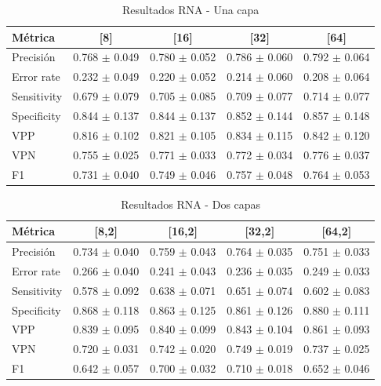 \documentclass[a4paper,10pt]{article}
\begin{document}
    \begin{table}[h!]
    \centering
    \caption{Resultados RNA - Una capa}
    \begin{tabular}{lcccc}
    \toprule
    Métrica & [8] & [16] & [32] & [64] \\
    \midrule
    Precisión & 0.768 $\pm$ 0.049 & 0.780 $\pm$ 0.052 & 0.786 $\pm$ 0.060 & 0.792 $\pm$ 0.064 \\
    Error rate & 0.232 $\pm$ 0.049 & 0.220 $\pm$ 0.052 & 0.214 $\pm$ 0.060 & 0.208 $\pm$ 0.064 \\
    Sensitivity & 0.679 $\pm$ 0.079 & 0.705 $\pm$ 0.085 & 0.709 $\pm$ 0.077 & 0.714 $\pm$ 0.077 \\
    Specificity & 0.844 $\pm$ 0.137 & 0.844 $\pm$ 0.137 & 0.852 $\pm$ 0.144 & 0.857 $\pm$ 0.148 \\
    VPP & 0.816 $\pm$ 0.102 & 0.821 $\pm$ 0.105 & 0.834 $\pm$ 0.115 & 0.842 $\pm$ 0.120 \\
    VPN & 0.755 $\pm$ 0.025 & 0.771 $\pm$ 0.033 & 0.772 $\pm$ 0.034 & 0.776 $\pm$ 0.037 \\
    F1 & 0.731 $\pm$ 0.040 & 0.749 $\pm$ 0.046 & 0.757 $\pm$ 0.048 & 0.764 $\pm$ 0.053 \\
    \bottomrule
    \end{tabular}
    \label{tab:ann_one_layer}
    \end{table}
    \begin{table}[h!]
    \centering
    \caption{Resultados RNA - Dos capas}
    \begin{tabular}{lcccc}
    \toprule
    Métrica & [8,2] & [16,2] & [32,2] & [64,2] \\
    \midrule
    Precisión & 0.734 $\pm$ 0.040 & 0.759 $\pm$ 0.043 & 0.764 $\pm$ 0.035 & 0.751 $\pm$ 0.033 \\
    Error rate & 0.266 $\pm$ 0.040 & 0.241 $\pm$ 0.043 & 0.236 $\pm$ 0.035 & 0.249 $\pm$ 0.033 \\
    Sensitivity & 0.578 $\pm$ 0.092 & 0.638 $\pm$ 0.071 & 0.651 $\pm$ 0.074 & 0.602 $\pm$ 0.083 \\
    Specificity & 0.868 $\pm$ 0.118 & 0.863 $\pm$ 0.125 & 0.861 $\pm$ 0.126 & 0.880 $\pm$ 0.111 \\
    VPP & 0.839 $\pm$ 0.095 & 0.840 $\pm$ 0.099 & 0.843 $\pm$ 0.104 & 0.861 $\pm$ 0.093 \\
    VPN & 0.720 $\pm$ 0.031 & 0.742 $\pm$ 0.020 & 0.749 $\pm$ 0.019 & 0.737 $\pm$ 0.025 \\
    F1 & 0.642 $\pm$ 0.057 & 0.700 $\pm$ 0.032 & 0.710 $\pm$ 0.018 & 0.652 $\pm$ 0.046 \\
    \bottomrule
    \end{tabular}
    \label{tab:ann_two_layers}
    \end{table}
    
\end{document}

